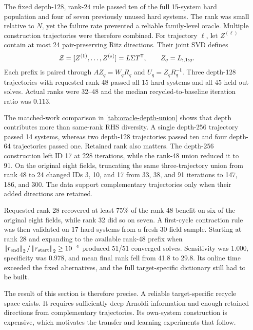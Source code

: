The fixed depth-128, rank-24 rule passed ten of the full 15-system hard population and four of seven previously unused hard systems. The rank was small relative to $N$, yet the failure rate prevented a reliable family-level oracle. Multiple construction trajectories were therefore combined. For trajectory $\ell$, let $Z^{(\ell)}$ contain at most 24 pair-preserving Ritz directions. Their joint SVD defines
\begin{equation}
 \mathcal Z=[Z^{(1)},\ldots,Z^{(s)}]=L\Sigma T^{\mathsf T},
 \qquad Z_q=L_{:,1:q}.
 \label{eq:joint-ritz-union}
\end{equation}
Each prefix is paired through $AZ_q=W_qR_q$ and $U_q=Z_qR_q^{-1}$. Three depth-128 trajectories with requested rank 48 passed all 15 hard systems and all 45 held-out solves. Actual ranks were 32--48 and the median recycled-to-baseline iteration ratio was 0.113.



The matched-work comparison in \cref{tab:oracle-depth-union} shows that depth contributes more than same-rank RHS diversity. A single depth-256 trajectory passed 14 systems, whereas two depth-128 trajectories passed ten and four depth-64 trajectories passed one. Retained rank also matters. The depth-256 construction left ID 17 at 228 iterations, while the rank-48 union reduced it to 91. On the original eight fields, truncating the same three-trajectory union from rank 48 to 24 changed IDs 3, 10, and 17 from 33, 38, and 91 iterations to 147, 186, and 300. The data support complementary trajectories only when their added directions are retained.

Requested rank 28 recovered at least 75\% of the rank-48 benefit on six of the original eight fields, while rank 32 did so on seven. A first-cycle contraction rule was then validated on 17 hard systems from a fresh 30-field sample. Starting at rank 28 and expanding to the available rank-48 prefix when $\left\lVert r_{\rm end}\right\rVert_2/\left\lVert r_{\rm start}\right\rVert_2\ge10^{-4}$ produced 51/51 converged solves. Sensitivity was 1.000, specificity was 0.978, and mean final rank fell from 41.8 to 29.8. Its online time exceeded the fixed alternatives, and the full target-specific dictionary still had to be built.

The result of this section is therefore precise. A reliable target-specific recycle space exists. It requires sufficiently deep Arnoldi information and enough retained directions from complementary trajectories. Its own-system construction is expensive, which motivates the transfer and learning experiments that follow.

